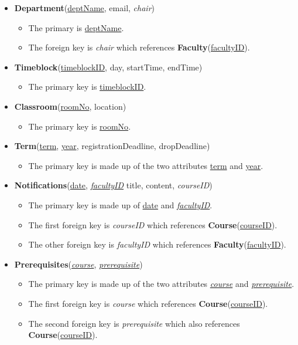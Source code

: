 \documentclass{report}
\begin{document}
\begin{itemize}
    \item \textbf{Department}(\underline{deptName}, email, \textit{chair})
    \begin{itemize}
        \item The primary is \underline{deptName}.
        \item The foreign key is \textit{chair} which references \textbf{Faculty}(\underline{facultyID}).
    \end{itemize}

    \item \textbf{Timeblock}(\underline{timeblockID}, day, startTime, endTime)
    \begin{itemize}
        \item The primary key is \underline{timeblockID}.
    \end{itemize}

    \item \textbf{Classroom}(\underline{roomNo}, location)
    \begin{itemize}
        \item The primary key is \underline{roomNo}.
    \end{itemize}
    
    \item \textbf{Term}(\underline{term}, \underline{year}, registrationDeadline, dropDeadline)
    \begin{itemize}
        \item The primary key is made up of the two attributes \underline{term} and \underline{year}.
    \end{itemize}

    \item \textbf{Notifications}(\underline{date}, \underline{\textit{facultyID}} title, content, \textit{courseID})
    \begin{itemize}
        \item The primary key is made up of \underline{date} and \underline{\textit{facultyID}}.
        \item The first foreign key is \textit{courseID} which references \textbf{Course}(\underline{courseID}).
        \item The other foreign key is \textit{facultyID} which references \textbf{Faculty}(\underline{facultyID}).
    \end{itemize}

    \item \textbf{Prerequisites}(\underline{\textit{course}}, \underline{\textit{prerequisite}})
    \begin{itemize}
        \item The primary key is made up of the two attributes \underline{\textit{course}} and \underline{\textit{prerequisite}}.
        \item The first foreign key is \textit{course} which references \textbf{Course}(\underline{courseID}).
        \item The second foreign key is \textit{prerequisite} which also references \textbf{Course}(\underline{courseID}).
    \end{itemize}


\end{itemize}
\end{document}
